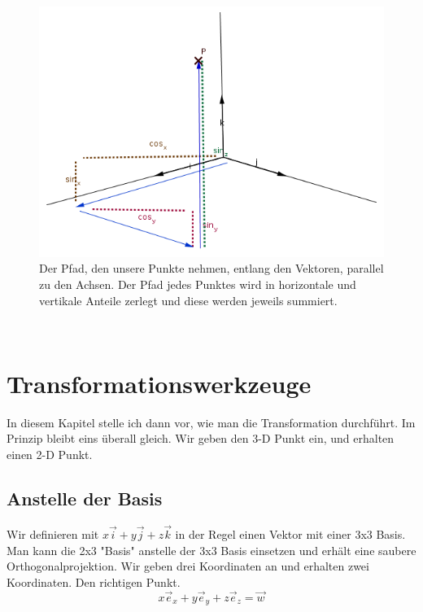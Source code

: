 \documentclass[a4paper]{article}
\begin{document}
\begin{figure}[ht]
\includegraphics[scale=0.5]{pathhacked.png}
\caption{Der Pfad, den unsere Punkte nehmen, entlang den Vektoren, parallel zu den Achsen. Der Pfad jedes Punktes wird in horizontale und vertikale Anteile zerlegt und diese werden jeweils summiert.}
\end{figure}\\

\section{Transformationswerkzeuge}

In diesem Kapitel stelle ich dann vor, wie man die Transformation durchf\"uhrt. Im Prinzip bleibt eins \"uberall gleich. Wir geben den 3-D Punkt ein, und erhalten einen 2-D Punkt.\\

\subsection{Anstelle der Basis}

Wir definieren mit $x\vec{i}+y\vec{j}+z\vec{k}$ in der Regel einen Vektor mit einer 3x3 Basis. Man kann die 2x3 "Basis" anstelle der 3x3 Basis einsetzen und erh\"alt eine saubere Orthogonalprojektion. Wir geben drei Koordinaten an und erhalten zwei Koordinaten. Den richtigen Punkt.\\

\begin{displaymath}
x\vec{e}_{x} + y\vec{e}_{y} + z\vec{e}_{z} = \vec{w} 
\end{displaymath}
\end{document}
